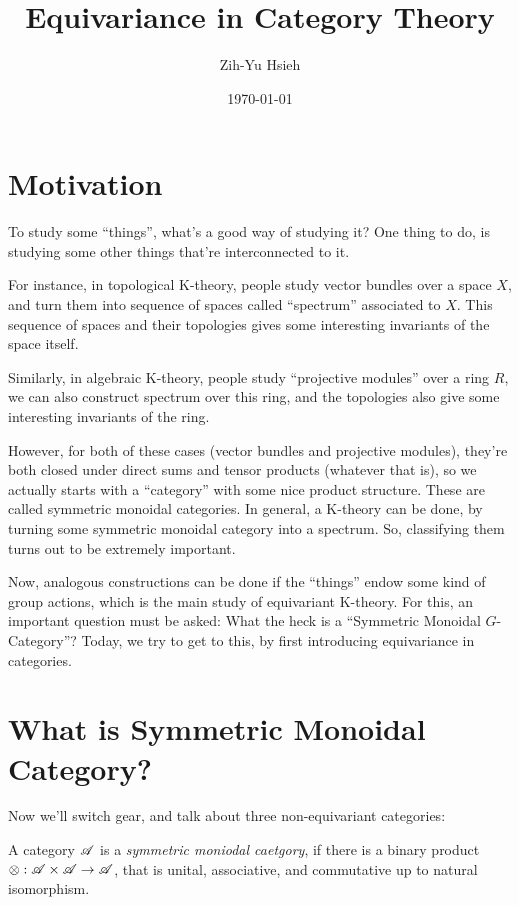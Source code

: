 \documentclass{article}
\title{Equivariance in Category Theory}
\author{Zih-Yu Hsieh}
\date{\today}
\begin{document}
\maketitle
\tableofcontents

\section{Motivation}

To study some ``things'', what's a good way of studying it? One thing to do, is studying some other things that're interconnected to it.

For instance, in topological K-theory, people study vector bundles over a space $X$, and turn them into sequence of spaces called ``spectrum'' associated to $X$. This sequence of spaces and their topologies gives some interesting invariants of the space itself.

Similarly, in algebraic K-theory, people study ``projective modules'' over a ring $R$, we can also construct spectrum over this ring, and the topologies also give some interesting invariants of the ring.

\hfil

However, for both of these cases (vector bundles and projective modules), they're both closed under direct sums and tensor products (whatever that is), so we actually starts with a ``category'' with some nice product structure. These are called symmetric monoidal categories. In general, a K-theory can be done, by turning some symmetric monoidal category into a spectrum. So, classifying them turns out to be extremely important.

Now, analogous constructions can be done if the ``things'' endow some kind of group actions, which is the main study of equivariant K-theory. For this, an important question must be asked: What the heck is a ``Symmetric Monoidal $G$-Category''? Today, we try to get to this, by first introducing equivariance in categories.

\hfil

\section{What is Symmetric Monoidal Category?}

Now we'll switch gear, and talk about three non-equivariant categories:

\begin{defn}
    A category $\mathscr{A}$ is a \emph{symmetric moniodal caetgory}, if there is a binary product $\otimes:\mathscr{A}\times\mathscr{A}\rightarrow\mathscr{A}$, that is unital, associative, and commutative up to natural isomorphism.
\end{defn}
\end{document}
